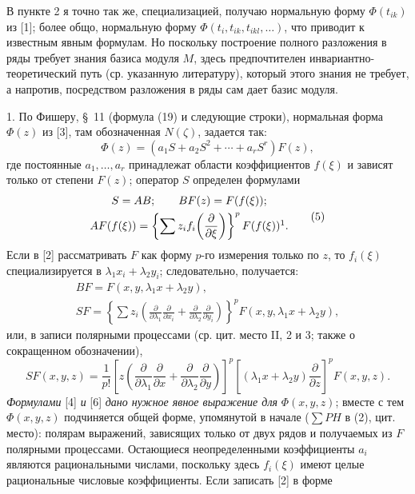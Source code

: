 \documentclass[11pt]{article}
\providecommand{\p}{\partial}
\begin{document}
В пункте 2 я точно так же, специализацией, получаю нормальную форму \(\Phi(t_{ik})\) из [1]; более общо, нормальную форму \(\Phi(t_i,t_{ik},t_{ikl},\ldots)\), что приводит к известным явным формулам. Но поскольку построение полного разложения в ряды требует знания базиса модуля \(M\), здесь предпочтителен инвариантно-теоретический путь (ср. указанную литературу), который этого знания не требует, а напротив, посредством разложения в ряды сам дает базис модуля.

1. По Фишеру, \S~11 (формула (19) и следующие строки), нормальная форма \(\Phi(z)\) из [3], там обозначенная \(N(\zeta)\), задается так:
\begin{equation}
        \Phi(z)=(a_1S+a_2S^2+\cdots+a_rS^r)F(z),
\tag{4}
\end{equation}
где постоянные \(a_1,\ldots,a_r\) принадлежат области коэффициентов \(f(\xi)\) и зависят только от степени \(F(z)\); оператор \(S\) определен формулами
\begin{equation}
\begin{gathered}
        S=AB;\qquad BF(z)=F(f(\xi));\\
        AF(f(\xi))=\left\{\sum z_i f_i\!\left(\frac{\p}{\p\xi}\right)\right\}^{p}F(f(\xi))\footnotemark.
\end{gathered}
\tag{5}
\end{equation}
Если в [2] рассматривать \(F\) как форму \(p\)-го измерения только по \(z\), то \(f_i(\xi)\) специализируется в \(\lambda_1x_i+\lambda_2y_i\); следовательно, получается:
\[
\begin{gathered}
        BF=F(x,y,\lambda_1x+\lambda_2y),\\
        SF=\left\{\sum z_i\left(\frac{\p}{\p\lambda_1}\frac{\p}{\p x_i}+
        \frac{\p}{\p\lambda_2}\frac{\p}{\p y_i}\right)\right\}^{p}
        F(x,y,\lambda_1x+\lambda_2y),
\end{gathered}
\]
или, в записи полярными процессами (ср. цит. место II, 2 и 3; также о сокращенном обозначении),
\begin{equation}
        SF(x,y,z)=\frac1{p!}\left[z\left(\frac{\p}{\p\lambda_1}\frac{\p}{\p x}+
        \frac{\p}{\p\lambda_2}\frac{\p}{\p y}\right)\right]^p
        \left[(\lambda_1x+\lambda_2y)\frac{\p}{\p z}\right]^p F(x,y,z).
\tag{6}
\end{equation}
\emph{Формулами} [4] \emph{и} [6] \emph{дано нужное явное выражение для} \(\Phi(x,y,z)\); вместе с тем \(\Phi(x,y,z)\) подчиняется общей форме, упомянутой в начале (\(\sum PH\) в (2), цит. место): полярам выражений, зависящих только от двух рядов и получаемых из \(F\) полярными процессами. Остающиеся неопределенными коэффициенты \(a_i\) являются рациональными числами, поскольку здесь \(f_i(\xi)\) имеют целые рациональные числовые коэффициенты. Если записать [2] в форме
\end{document}
